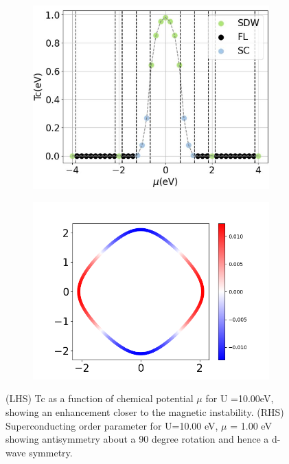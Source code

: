 \documentclass[12pt]{article}
\begin{document}
\begin{figure}[htbp]
    \centering
    \begin{subfigure}{0.40\textwidth} %
        \centering
        \includegraphics[width=\linewidth]{1NNTcformu.png}
        \vspace{2mm}
        \label{fig:sub3}
    \end{subfigure}
    \hfill
    \begin{subfigure}{0.50\textwidth} %
        \centering
        \includegraphics[width=\linewidth]{SC_gap_FS_1NN_0.0_10.00_1.00_80_5.png}
        \label{fig:sub2}
    \end{subfigure}
    \caption{(LHS) Tc as a function of chemical potential $\mu$ for U =10.00eV, showing an enhancement closer to the magnetic instability. (RHS) Superconducting order parameter for U=10.00 eV, $\mu$ = 1.00 eV showing antisymmetry about a 90 degree rotation and hence a d-wave symmetry.}
    \label{fig: SC_in_1NN}
\end{figure}
\end{document}
